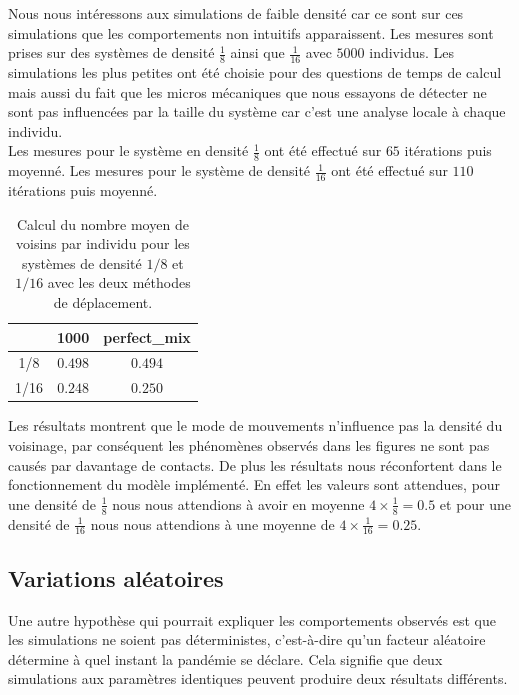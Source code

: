 Nous nous intéressons aux simulations de faible densité car ce sont sur ces simulations que les comportements non intuitifs apparaissent. Les mesures sont prises sur des systèmes de densité $\frac{1}{8}$ ainsi que $\frac{1}{16}$ avec $5000$ individus. Les simulations les plus petites ont été choisie pour des questions de temps de calcul mais aussi du fait que les micros mécaniques que nous essayons de détecter ne sont pas influencées par la taille du système car c'est une analyse locale à chaque individu.\\

Les mesures pour le système en densité $\frac{1}{8}$ ont été effectué sur $65$ itérations puis moyenné. Les mesures pour le système de densité $\frac{1}{16}$ ont été effectué sur $110$ itérations puis moyenné.

\begin{table}[H]
	\centering
	\captionsetup{justification=centering}
	\caption[Voisinage moyen : SI]{Calcul du nombre moyen de voisins par individu pour les systèmes de densité $1/8$ et $1/16$ avec les deux méthodes de déplacement.\label{tab:grid}}
	\begin{tabular}{@{\extracolsep{\fill} } c|| c| c|}
		     & 1000    & perfect\_mix \\
		\midrule
		\midrule
		1/8  & $0.498$ & $0.494$      \\
		\midrule
		1/16 & $0.248$ & $0.250$      \\
		\bottomrule
	\end{tabular}
\end{table}

Les résultats montrent que le mode de mouvements n'influence pas la densité du voisinage, par conséquent les phénomènes observés dans les figures ne sont pas causés par davantage de contacts. De plus les résultats nous réconfortent dans le fonctionnement du modèle implémenté. En effet les valeurs sont attendues, pour une densité de $\frac{1}{8}$ nous nous attendions à avoir en moyenne $4\times \frac{1}{8} = 0.5$ et pour une densité de $\frac{1}{16}$ nous nous attendions à une moyenne de $4\times \frac{1}{16} = 0.25$.

\subsection{Variations aléatoires}

Une autre hypothèse qui pourrait expliquer les comportements observés est que les simulations ne soient pas déterministes, c'est-à-dire qu'un facteur aléatoire détermine à quel instant la pandémie se déclare. Cela signifie que deux simulations aux paramètres identiques peuvent produire deux résultats différents.\\

